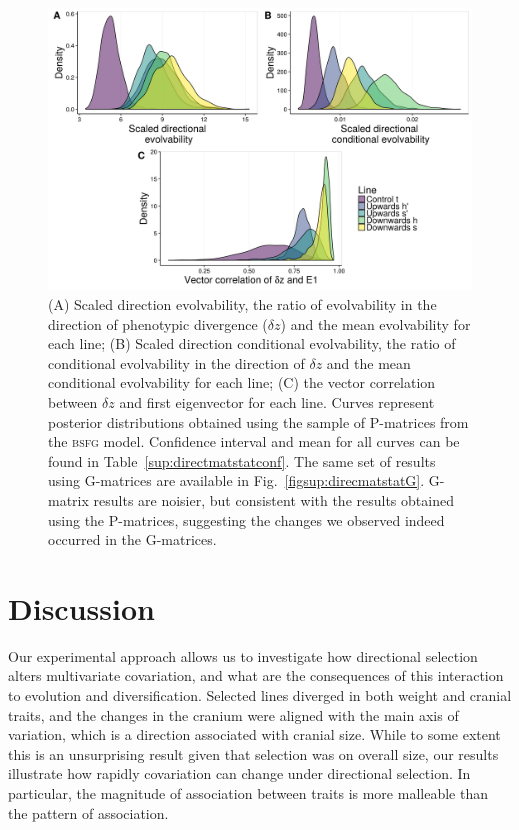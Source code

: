 \begin{refsection}
\begin{figure}
    \centering
    \includegraphics[width=\textwidth]{chapter_ratones/media/figure4.png}
    \caption[Directional evolutionary statistics in selected and control lines]{(A)
Scaled direction evolvability, the ratio of evolvability in the
direction of phenotypic divergence (\(\delta z\)) and the mean
evolvability for each line; (B) Scaled direction conditional
evolvability, the ratio of conditional evolvability in the direction of
\(\delta z\) and the mean conditional evolvability for each line; (C)
the vector correlation between \(\delta z\) and first eigenvector for
each line. Curves represent posterior distributions obtained using the
sample of P-matrices from the \textsc{bsfg} model. Confidence interval and mean
for all curves can be found in Table~\ref{sup:directmatstatconf}. The same set of results using
G-matrices are available in Fig.~\ref{figsup:direcmatstatG}. G-matrix results are noisier, but
consistent with the results obtained using the P-matrices, suggesting
the changes we observed indeed occurred in the G-matrices.}
    \label{fig-dzpc1}
\end{figure}

\section{Discussion}

Our experimental approach allows us to investigate how directional
selection alters multivariate covariation, and what are the consequences
of this interaction to evolution and diversification. Selected lines
diverged in both weight and cranial traits, and the changes in the
cranium were aligned with the main axis of variation, which is a
direction associated with cranial size. While to some extent this is an
unsurprising result given that selection was on overall size, our
results illustrate how rapidly covariation can change under directional
selection. In particular, the magnitude of association between traits is
more malleable than the pattern of association.


\end{refsection}
